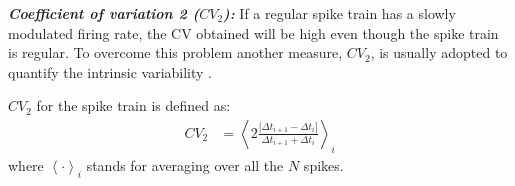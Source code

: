 \textbf{\textit{Coefficient of variation 2 ($CV_2$):}}
If a regular spike train has a slowly modulated firing rate, the CV obtained will be high even though the spike train is regular. To overcome this problem another measure, $CV_2$,  is usually adopted to quantify the intrinsic variability \cite{Holt1996}.

$CV_2$ for the spike train is defined as: \\
\begin{align}
CV_{2} &= \left\langle 2 \frac{|\Delta t_{i+1} - \Delta t_{i}|}{\Delta t_{i+1} + \Delta t_{i}} \right\rangle_{i}
\end{align}
where $\left\langle \cdot \right\rangle_{i}$ stands for averaging over all the $N$ spikes.

